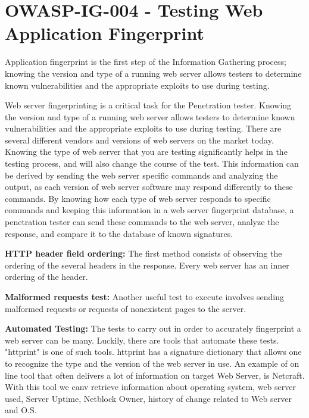 		\section{OWASP-IG-004 - Testing Web Application Fingerprint}
			Application fingerprint is the first step of the Information Gathering process; knowing 
			the version and type of a running web server allows testers to determine known 
			vulnerabilities and the appropriate exploits to use during testing.

			Web server fingerprinting is a critical task for the Penetration tester. Knowing the version 
			and type of a running web server allows testers to determine known vulnerabilities and the
			appropriate exploits to use during testing. There are several different vendors and versions 
			of web servers on the market today. Knowing the type of web server that you are testing
			significantly helps in the testing process, and will also change the course of the test. 
			This information can be derived by sending the web server specific commands and analyzing the 
			output, as each version of web server software may respond differently to these commands. 
			By knowing how each type of web server responds to specific commands and keeping this 
			information in a web server fingerprint database, a penetration tester can send these 
			commands to the web server, analyze the response, and compare it to the database of known signatures. 

			{\bf HTTP header field ordering:}
			The first method consists of observing the ordering of the several headers in the response. 
			Every web server has an inner ordering of the header. 

			{\bf Malformed requests test:}
			Another useful test to execute involves sending malformed requests or requests of nonexistent
			pages to the server.

			{\bf Automated Testing:}
			The tests to carry out in order to accurately fingerprint a web server can be many. 
			Luckily, there are tools that automate these tests. "httprint" is one of such tools. 
			httprint has a signature dictionary that allows one to recognize the type and the
			version of the web server in use. An example of on line tool that often delivers a lot 
			of information on target Web Server, is Netcraft. With this tool we canv
			retrieve information about operating system, web server used, Server Uptime, Netblock 
			Owner, history of change related to Web server and O.S.

		

